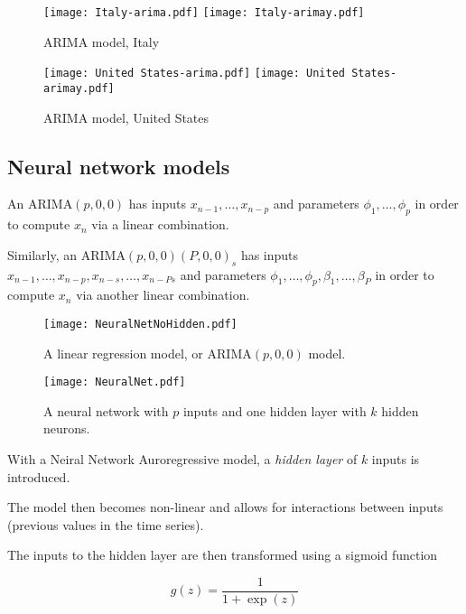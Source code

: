 \begin{figure}[H]
  \texttt{[image: Italy-arima.pdf]} \label{fig:italy-arima}
\endminipage\hfill
{}
  \texttt{[image: Italy-arimay.pdf]} \label{fig:italy-arimay}
\endminipage
\caption{ARIMA model, Italy}
\end{figure}

\begin{figure}[H]
  \texttt{[image: United States-arima.pdf]} \label{fig:usa-arima}
\endminipage\hfill
{}
  \texttt{[image: United States-arimay.pdf]} \label{fig:usa-arimay}
\endminipage
\caption{ARIMA model, United States}
\end{figure}

\subsection{Neural network models}

An ARIMA$(p,0,0)$ has inputs $x_{n-1},\dots,x_{n-p}$ and parameters $\phi_{1},\dots,\phi_{p}$ in order to compute $x_n$ via a linear combination.

Similarly, an ARIMA$(p,0,0)(P,0,0)_s$ has inputs $x_{n-1},\dots,x_{n-p}, x_{n-s},\dots,x_{n-Ps}$ and parameters $\phi_{1},\dots,\phi_{p}, \beta_1,\dots,\beta_P$ in order to compute $x_n$ via another linear combination.

\begin{figure}[H]
\texttt{[image: NeuralNetNoHidden.pdf]} 
\caption{A linear regression model, or ARIMA$(p,0,0)$ model.}
\label{fig:nnetnohidden}
\endminipage\hfill
{}
\texttt{[image: NeuralNet.pdf]}
\caption{A neural network with $p$ inputs and one hidden layer with $k$ hidden neurons.}
 \label{fig:nnet}
\endminipage
\end{figure}

With a Neiral Network Auroregressive model, a \textit{hidden layer} of $k$ inputs is introduced.

The model then becomes non-linear and allows for interactions between inputs (previous values in the time series).

The inputs to the hidden layer are then transformed using a sigmoid function

\begin{equation}\label{eq:sigmoid}
g(z)=\frac{1}{1+\exp(z)}
\end{equation}

